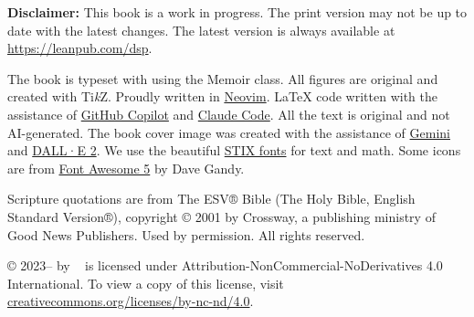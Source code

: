 \documentclass[print,gray]{dspbook}
\begin{document}
\vfill

{
  \footnotesize\noindent
  \textbf{Disclaimer:} This book is a work in progress.  The print version may not be up
  to date with the latest changes.  The latest version is always available at
  \url{https://leanpub.com/dsp}.
}

\vspace{0.5cm}
{
\footnotesize\noindent
The book is typeset with \XeTeX{} using the Memoir class.  All figures are
original and created with Ti\textit{k}Z.  Proudly written in
\href{https://neovim.io/}{Neovim}.  \LaTeX{} code written with the assistance of
\href{https://github.com/features/copilot}{GitHub Copilot} and
\href{https://www.anthropic.com/claude-code}{Claude Code}.
All the text is original and not AI-generated.
The book cover image was created with the assistance of
\href{https://gemini.google.com}{Gemini} and \href{https://openai.com/dall-e-2}{DALL·E 2}.
We use the beautiful \href{https://www.stixfonts.org/}{STIX fonts} for text and math.
Some icons are from \href{https://fontawesome.com/}{Font Awesome 5} by Dave Gandy.
}

\vspace{0.5cm}
{
\footnotesize\noindent
Scripture quotations are from The ESV® Bible (The Holy Bible, English Standard Version®),
copyright © 2001 by Crossway, a publishing ministry of Good News Publishers. Used by
permission. All rights reserved.
}

\vspace{0.5cm}
{
\footnotesize\noindent
\thetitle{} © 2023--\the\year{} by \theauthor{}~ is licensed under
Attribution-NonCommercial-NoDerivatives 4.0 International. To view a copy of this license,
visit
\href{http://creativecommons.org/licenses/by-nc-nd/4.0/}{creativecommons.org/licenses/by-nc-nd/4.0}.
}

\cleardoublepage



\cleardoublepage



\cleardoublepage

\tableofcontents

\cleardoublepage

\mainmatter










\startappendices




\backmatter

\printglossary

\printbibliography[heading=bibintoc]
\end{document}
